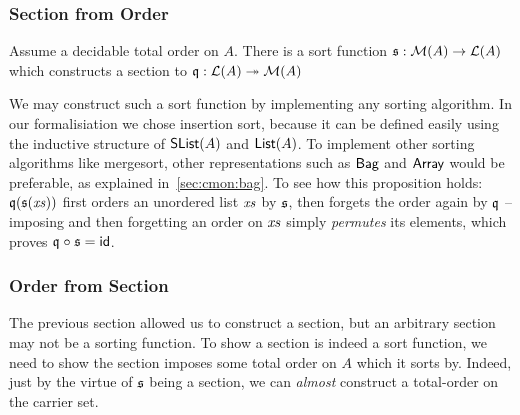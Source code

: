 \subsubsection{Section from Order}
\label{sec:sort-section-from-order}

\begin{proposition}
    Assume a decidable total order on $A$. There is a sort function $\mathfrak{s}: \mathcal{M}(A) \to \mathcal{L}(A)$
    which constructs a section to $\mathfrak{q} : \mathcal{L}(A) \twoheadrightarrow \mathcal{M}(A)$
\end{proposition}

\begin{proofsketch}
    We may construct such a sort function by implementing any sorting algorithm.
    In our formalisiation we chose insertion sort,
    because it can be defined easily using the inductive structure of $\operatorname{\mathsf{SList}}(A)$ and $\operatorname{\mathsf{List}}(A)$.
    To implement other sorting algorithms like mergesort,
    other representations such as $\operatorname{\mathsf{Bag}}$ and $\operatorname{\mathsf{Array}}$ would be preferable,
    as explained in~\cref{sec:cmon:bag}.
    To see how this proposition holds: $\mathfrak{q}(\mathfrak{s}(\mathit{xs}))$ first orders an unordered list $\mathit{xs}$ by $\mathfrak{s}$,
    then forgets the order again by $\mathfrak{q}$ --
    imposing and then forgetting an order on $\mathit{xs}$ simply \emph{permutes} its elements,
    which proves $\mathfrak{q} \mathrel{\circ} \mathfrak{s} = \operatorname{\mathsf{id}}$.
\end{proofsketch}

\subsubsection{Order from Section}
\label{sec:sort-order-from-section}

The previous section allowed us to construct a section, but an arbitrary section may not be a sorting function.
%
To show a section is indeed a sort function, we need to show the section imposes some total order on $A$ which it sorts by.
%
Indeed, just by the virtue of $\mathfrak{s}$ being a section,
we can \emph{almost} construct a total-order on the carrier set.

